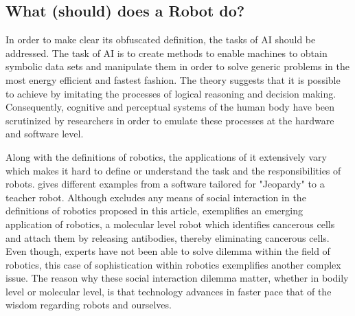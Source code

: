 \documentclass[man]{apa6}
\begin{document}
\subsection{What (should) does a Robot do?}
In order to make clear its obfuscated definition, the tasks of AI should be addressed. The task of AI is to create methods to enable machines to obtain symbolic data sets and manipulate them in order to solve generic problems in the most energy efficient and fastest fashion. The theory suggests that it is possible to achieve by imitating the processes of logical reasoning and decision making. Consequently, cognitive and perceptual systems of the human body have been scrutinized by researchers in order to emulate these processes at the hardware and software level.\par
Along with the definitions of robotics, the applications of it extensively vary which makes it hard to define or understand the task and the responsibilities of robots.  gives different examples from a software tailored for "Jeopardy" to a teacher robot.
Although  excludes any means of social interaction in the definitions of robotics proposed in this article,  exemplifies an emerging application of robotics, a molecular level robot which identifies cancerous cells and attach them by releasing antibodies, thereby eliminating cancerous cells. Even though, experts have not been able to solve dilemma within the field of robotics, this case of sophistication within robotics exemplifies another complex issue.
The reason why these social interaction dilemma matter, whether in bodily level or molecular level, is that technology advances in faster pace that of the wisdom regarding robots and ourselves.\par
\end{document}
